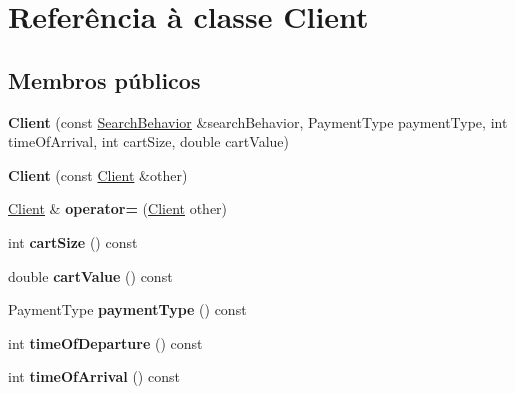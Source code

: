 \hypertarget{classClient}{\section{Referência à classe Client}
\label{d1/d37/classClient}
}
\subsection*{Membros públicos}
\begin{DoxyCompactItemize}
\item 
\hypertarget{classClient_a3b5a8f683ebd0abdf91b8cfe4c8be817}{{\bfseries Client} (const \hyperlink{classSearchBehavior}{Search\-Behavior} \&search\-Behavior, Payment\-Type payment\-Type, int time\-Of\-Arrival, int cart\-Size, double cart\-Value)}\label{d1/d37/classClient_a3b5a8f683ebd0abdf91b8cfe4c8be817}

\item 
\hypertarget{classClient_a4d8e3b9fdfa24b7586bcf24537b89b67}{{\bfseries Client} (const \hyperlink{classClient}{Client} \&other)}\label{d1/d37/classClient_a4d8e3b9fdfa24b7586bcf24537b89b67}

\item 
\hypertarget{classClient_acc35776f6a75d2fb8d4abfb3cc33f8a3}{\hyperlink{classClient}{Client} \& {\bfseries operator=} (\hyperlink{classClient}{Client} other)}\label{d1/d37/classClient_acc35776f6a75d2fb8d4abfb3cc33f8a3}

\item 
\hypertarget{classClient_a2ef5728c74cc7f9dfce8b5e9e950427c}{int {\bfseries cart\-Size} () const }\label{d1/d37/classClient_a2ef5728c74cc7f9dfce8b5e9e950427c}

\item 
\hypertarget{classClient_a52b9e8ce7f11c440fb532f6056db5fe2}{double {\bfseries cart\-Value} () const }\label{d1/d37/classClient_a52b9e8ce7f11c440fb532f6056db5fe2}

\item 
\hypertarget{classClient_a9cceb950fc9c53ea35bcddf6214e4e4f}{Payment\-Type {\bfseries payment\-Type} () const }\label{d1/d37/classClient_a9cceb950fc9c53ea35bcddf6214e4e4f}

\item 
\hypertarget{classClient_ae56c063a8bc1c57e9c47ad88b1770994}{int {\bfseries time\-Of\-Departure} () const }\label{d1/d37/classClient_ae56c063a8bc1c57e9c47ad88b1770994}

\item 
\hypertarget{classClient_af327f525b4cf7838d97c095c8dd00e60}{int {\bfseries time\-Of\-Arrival} () const }\label{d1/d37/classClient_af327f525b4cf7838d97c095c8dd00e60}


\end{DoxyCompactItemize}
